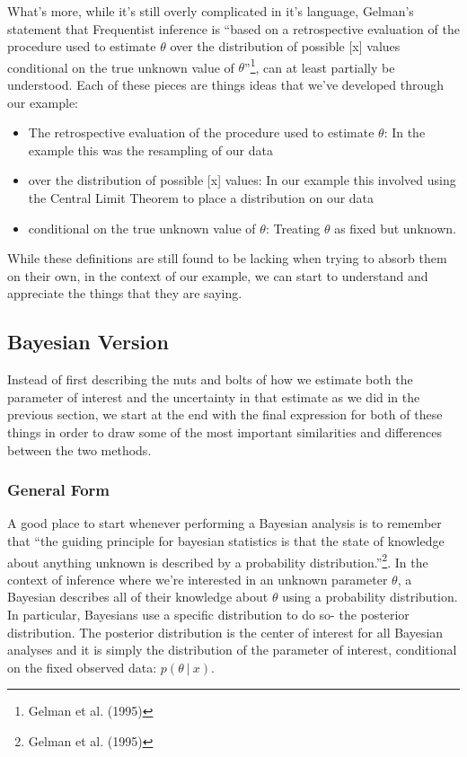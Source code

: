 \documentclass[12pt,twoside]{reedthesis}
\providecommand{\tightlist}{%
  \setlength{\itemsep}{0pt}\setlength{\parskip}{0pt}}
\begin{document}
What's more, while it's still overly complicated in it's language, Gelman's statement that Frequentist inference is ``based on a retrospective evaluation of the procedure used to estimate \(\theta\) over the distribution of possible {[}x{]} values conditional on the true unknown value of \(\theta\)''\footnote{Gelman et al. (1995)}, can at least partially be understood. Each of these pieces are things ideas that we've developed through our example:
\begin{itemize}
\tightlist
\item
  The retrospective evaluation of the procedure used to estimate \(\theta\): In the example this was the resampling of our data
\item
  over the distribution of possible {[}x{]} values: In our example this involved using the Central Limit Theorem to place a distribution on our data
\item
  conditional on the true unknown value of \(\theta\): Treating \(\theta\) as fixed but unknown.
\end{itemize}
While these definitions are still found to be lacking when trying to absorb them on their own, in the context of our example, we can start to understand and appreciate the things that they are saying.

\hypertarget{bayesian-version}{%
\subsection{Bayesian Version}\label{bayesian-version}}

Instead of first describing the nuts and bolts of how we estimate both the parameter of interest and the uncertainty in that estimate as we did in the previous section, we start at the end with the final expression for both of these things in order to draw some of the most important similarities and differences between the two methods.

\hypertarget{general-form}{%
\subsubsection{General Form}\label{general-form}}

A good place to start whenever performing a Bayesian analysis is to remember that ``the guiding principle for bayesian statistics is that the state of knowledge about anything unknown is described by a probability distribution.''\footnote{Gelman et al. (1995)}. In the context of inference where we're interested in an unknown parameter \(\theta\), a Bayesian describes all of their knowledge about \(\theta\) using a probability distribution. In particular, Bayesians use a specific distribution to do so- the posterior distribution. The posterior distribution is the center of interest for all Bayesian analyses and it is simply the distribution of the parameter of interest, conditional on the fixed observed data: \(p(\theta \ | \ x)\).
\end{document}
